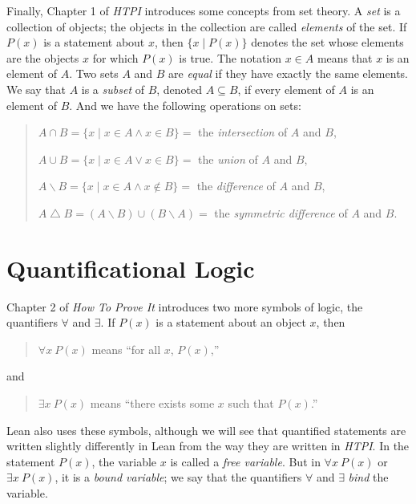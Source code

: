 \documentclass[
  letterpaper,
  DIV=11,
  numbers=noendperiod]{scrreprt}
\begin{document}
Finally, Chapter 1 of \emph{HTPI} introduces some concepts from set
theory. A \emph{set} is a collection of objects; the objects in the
collection are called \emph{elements} of the set. If \(P(x)\) is a
statement about \(x\), then \(\{x \mid P(x)\}\) denotes the set whose
elements are the objects \(x\) for which \(P(x)\) is true. The notation
\(x \in A\) means that \(x\) is an element of \(A\). Two sets \(A\) and
\(B\) are \emph{equal} if they have exactly the same elements. We say
that \(A\) is a \emph{subset} of \(B\), denoted \(A \subseteq B\), if
every element of \(A\) is an element of \(B\). And we have the following
operations on sets:

\begin{quote}
\(A \cap B = \{x \mid x \in A \wedge x \in B\} = {}\) the
\emph{intersection} of \(A\) and \(B\),

\(A \cup B = \{x \mid x \in A \vee x \in B\} = {}\) the \emph{union} of
\(A\) and \(B\),

\(A \mathbin{\backslash} B = \{x \mid x \in A \wedge x \notin B\} = {}\)
the \emph{difference} of \(A\) and \(B\),

\(A \bigtriangleup B = (A \mathbin{\backslash} B) \cup (B \mathbin{\backslash} A) = {}\)
the \emph{symmetric difference} of \(A\) and \(B\).

\end{quote}


\hypertarget{quantificational-logic}{%
\chapter{Quantificational Logic}\label{quantificational-logic}}

Chapter 2 of \emph{How To Prove It} introduces two more symbols of
logic, the quantifiers \(\forall\) and \(\exists\). If \(P(x)\) is a
statement about an object \(x\), then

\begin{quote}
\(\forall x\ P(x)\) means ``for all \(x\), \(P(x)\),''

\end{quote}

and

\begin{quote}
\(\exists x\ P(x)\) means ``there exists some \(x\) such that
\(P(x)\).''

\end{quote}

Lean also uses these symbols, although we will see that quantified
statements are written slightly differently in Lean from the way they
are written in \emph{HTPI}. In the statement \(P(x)\), the variable
\(x\) is called a \emph{free variable}. But in \(\forall x\ P(x)\) or
\(\exists x\ P(x)\), it is a \emph{bound variable}; we say that the
quantifiers \(\forall\) and \(\exists\) \emph{bind} the variable.
\end{document}
